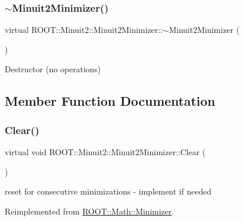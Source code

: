 \subsubsection{\texorpdfstring{$\sim$Minuit2Minimizer()}{~Minuit2Minimizer()}\hspace{0.1cm}{\footnotesize\ttfamily [2/2]}}
{\footnotesize\ttfamily virtual R\+O\+O\+T\+::\+Minuit2\+::\+Minuit2\+Minimizer\+::$\sim$\+Minuit2\+Minimizer (\begin{DoxyParamCaption}{ }\end{DoxyParamCaption})\hspace{0.3cm}{\ttfamily [virtual]}}

Destructor (no operations) 

\subsection{Member Function Documentation}
\mbox{\label{classROOT_1_1Minuit2_1_1Minuit2Minimizer_a11e6ce9a4285080548f9855b78ca83b4}} 
\subsubsection{\texorpdfstring{Clear()}{Clear()}\hspace{0.1cm}{\footnotesize\ttfamily [1/2]}}
{\footnotesize\ttfamily virtual void R\+O\+O\+T\+::\+Minuit2\+::\+Minuit2\+Minimizer\+::\+Clear (\begin{DoxyParamCaption}{ }\end{DoxyParamCaption})\hspace{0.3cm}{\ttfamily [virtual]}}



reset for consecutive minimizations -\/ implement if needed 



Reimplemented from \mbox{\hyperlink{classROOT_1_1Math_1_1Minimizer_ad7308846baecf68fb0dbc2d5e4caa178}{R\+O\+O\+T\+::\+Math\+::\+Minimizer}}.

\mbox{\label{classROOT_1_1Minuit2_1_1Minuit2Minimizer_a11e6ce9a4285080548f9855b78ca83b4}} 
